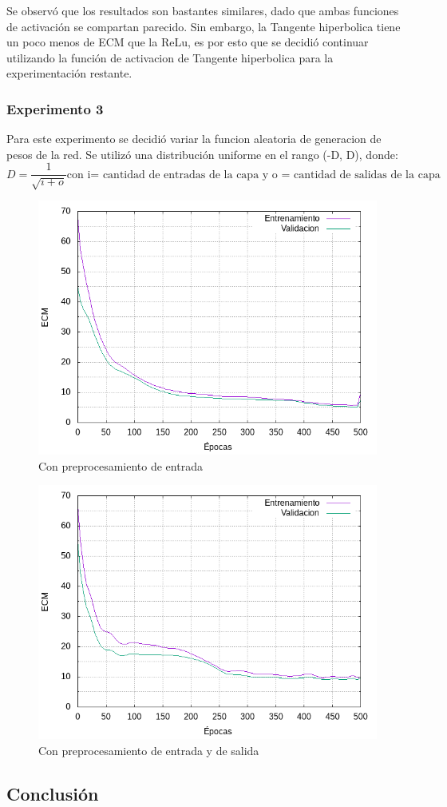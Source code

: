 Se observó que los resultados son bastantes similares, dado que ambas funciones de activación se compartan parecido. Sin embargo, la Tangente hiperbolica tiene un poco menos
de ECM que la ReLu, es por esto que se decidió continuar utilizando la función de activacion de Tangente hiperbolica para la experimentación restante.

\subsubsection{Experimento 3}
Para este experimento se decidió variar la funcion aleatoria de generacion de pesos de la red. Se utilizó una distribución uniforme en el rango (-D, D), donde:
\begin{equation}
  D = \frac{1}{\sqrt{i + o}} \mbox{con i= cantidad de entradas de la capa y o = cantidad de salidas de la capa}
\end{equation}

\begin{figure}[H]
  \includegraphics[width=125mm]{imagenes/ej2/ex_3-1_red-9-17-2_errors.png}
  \caption{Con preprocesamiento de entrada}
\end{figure}

\begin{figure}[H]
  \includegraphics[width=125mm]{imagenes/ej2/ex_3-2_red-9-17-2_errors.png}
  \caption{Con preprocesamiento de entrada y de salida}
\end{figure}
\subsection{Conclusión}

\newpage
